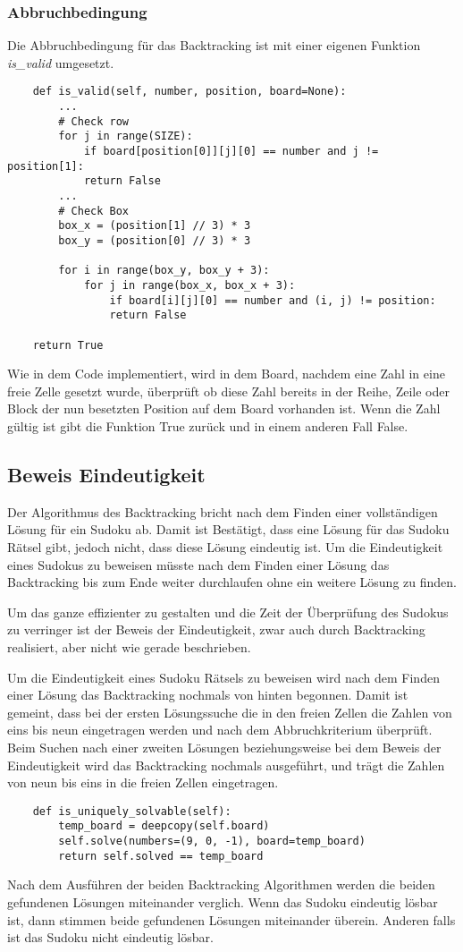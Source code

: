 \subsubsection{Abbruchbedingung}
Die Abbruchbedingung für das Backtracking ist mit einer eigenen Funktion \textit{is\_valid} umgesetzt.
\begin{lstlisting}
	def is_valid(self, number, position, board=None):
		...
		# Check row
		for j in range(SIZE):
			if board[position[0]][j][0] == number and j != position[1]:
			return False
		...
		# Check Box
		box_x = (position[1] // 3) * 3
		box_y = (position[0] // 3) * 3
		
		for i in range(box_y, box_y + 3):
			for j in range(box_x, box_x + 3):
				if board[i][j][0] == number and (i, j) != position:
				return False
		
	return True
\end{lstlisting}
Wie in dem Code implementiert, wird in dem Board, nachdem eine Zahl in eine freie Zelle gesetzt wurde, überprüft ob diese Zahl bereits in der Reihe, Zeile oder Block der nun besetzten Position auf dem Board vorhanden ist. Wenn die Zahl gültig ist gibt die Funktion True zurück und in einem anderen Fall False. \cite{knott_2017} 

\subsection{Beweis Eindeutigkeit}
Der Algorithmus des Backtracking bricht nach dem Finden einer vollständigen Lösung für ein Sudoku ab. Damit ist Bestätigt, dass eine Lösung für das Sudoku Rätsel gibt, jedoch nicht, dass diese Lösung eindeutig ist. Um die Eindeutigkeit eines Sudokus zu beweisen müsste nach dem Finden einer Lösung das Backtracking bis zum Ende weiter durchlaufen ohne ein weitere Lösung zu finden. 

Um das ganze effizienter zu gestalten und die Zeit der Überprüfung des Sudokus zu verringer ist der Beweis der Eindeutigkeit, zwar auch durch Backtracking realisiert, aber nicht wie gerade beschrieben.

Um die Eindeutigkeit eines Sudoku Rätsels zu beweisen wird nach dem Finden einer Lösung das Backtracking nochmals von hinten begonnen. Damit ist gemeint, dass bei der ersten Lösungssuche die in den freien Zellen die Zahlen von eins bis neun eingetragen werden und nach dem Abbruchkriterium überprüft. Beim Suchen nach einer zweiten Lösungen beziehungsweise bei dem Beweis der Eindeutigkeit wird das Backtracking nochmals ausgeführt, und trägt die Zahlen von neun bis eins in die freien Zellen eingetragen. 

\begin{lstlisting}
	def is_uniquely_solvable(self):
		temp_board = deepcopy(self.board)
		self.solve(numbers=(9, 0, -1), board=temp_board)
		return self.solved == temp_board
\end{lstlisting}
Nach dem Ausführen der beiden Backtracking Algorithmen werden die beiden gefundenen Lösungen miteinander verglich. Wenn das Sudoku eindeutig lösbar ist, dann stimmen beide gefundenen Lösungen miteinander überein. Anderen falls ist das Sudoku nicht eindeutig lösbar.
